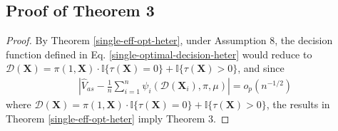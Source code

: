 \documentclass[11pt]{article}
\theoremstyle{referenceplain}
\theoremstyle{referencedefinition}
\theoremstyle{referenceremark}
\begin{document}
\subsection{Proof of Theorem 3}
\begin{proof}
    By Theorem \ref{single-eff-opt-heter}, under Assumption 8, the decision function defined in Eq. \eqref{single-optimal-decision-heter} would reduce to $\mathcal{D}(\mathbf{X})=\pi(1,\mathbf{X})\cdot\mathbb{I}\{\tau(\mathbf{X})=0\}+\mathbb{I}\{\tau(\mathbf{X})>0\}$, and since   
    \begin{align*}
        \left|\widehat{V}_{as}-\frac{1}{n}\sum_{i=1}^n \psi_i(\mathcal{D}(\mathbf{X}_i),\pi,\mu)\right|=o_p(n^{-1/2})
    \end{align*}
    where $\mathcal{D}(\mathbf{X})=\pi(1,\mathbf{X})\cdot\mathbb{I}\{\tau(\mathbf{X})=0\}+\mathbb{I}\{\tau(\mathbf{X})>0\}$, the results in Theorem \ref{single-eff-opt-heter} imply Theorem 3.
\end{proof}
\end{document}
